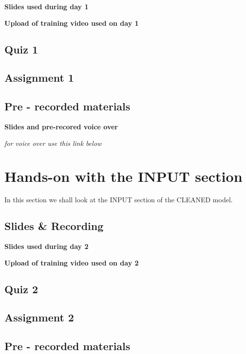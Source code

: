 \documentclass[
]{book}
\begin{document}
\textbf{Slides used during day 1}

\textbf{Upload of training video used on day 1}

\hypertarget{quiz-1}{%
\section{Quiz 1}\label{quiz-1}}

\hypertarget{assignment-1}{%
\section{Assignment 1}\label{assignment-1}}

\hypertarget{pre---recorded-materials}{%
\section{Pre - recorded materials}\label{pre---recorded-materials}}

\textbf{Slides and pre-recored voice over}

\emph{for voice over use this link below}

\hypertarget{hands-on-with-the-input-section}{%
\chapter{Hands-on with the INPUT section}\label{hands-on-with-the-input-section}}

In this section we shall look at the INPUT section of the CLEANED model.

\hypertarget{slides-recording}{%
\section{Slides \& Recording}\label{slides-recording}}

\textbf{Slides used during day 2}

\textbf{Upload of training video used on day 2}

\hypertarget{quiz-2}{%
\section{Quiz 2}\label{quiz-2}}

\hypertarget{assignment-2}{%
\section{Assignment 2}\label{assignment-2}}

\hypertarget{pre---recorded-materials}{%
\section{Pre - recorded materials}\label{pre---recorded-materials}}
\end{document}
